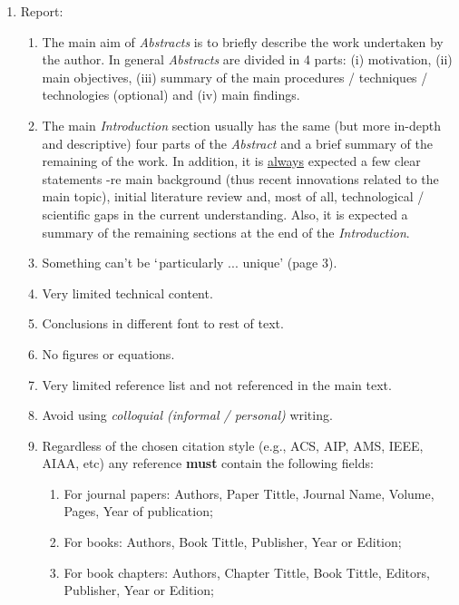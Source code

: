 \documentclass[14pt,twoside]{report}
\begin{document}
\begin{enumerate}

\item Report:
\begin{enumerate}
%
\item The main aim of {\it Abstracts} is to briefly describe the work undertaken by the author. In general {\it Abstracts} are divided in 4 parts: (i) motivation, (ii) main objectives, (iii) summary of the main procedures / techniques / technologies (optional) and (iv) main findings. 
%
\item The main {\it Introduction} section usually has the same (but more in-depth and descriptive) four parts of the {\it Abstract} and a brief summary of the remaining of the work. In addition, it is \underline{always} expected a few clear statements -re main background (thus recent innovations related to the main topic), initial literature review and, most of all, technological / scientific gaps in the current understanding. Also, it is expected a summary of the remaining sections at the end of the {\it Introduction}.
%
\item Something can't be $\lq$particularly ... unique' (page 3).
%
\item Very limited technical content.
%
\item Conclusions in different font to rest of text.
%
\item No figures or equations.
%
\item Very limited reference list and not referenced in the main text.
%
%
\item Avoid using {\it colloquial (informal / personal)} writing.
%
\item Regardless of the chosen citation style (e.g., ACS, AIP, AMS, IEEE, AIAA, etc) any reference {\bf must} contain the following fields: 
\begin{enumerate}
\item For journal papers: Authors, Paper Tittle, Journal Name, Volume, Pages, Year of publication;
\item For books: Authors, Book Tittle, Publisher, Year or Edition;
\item For book chapters: Authors, Chapter Tittle, Book Tittle, Editors, Publisher, Year or Edition;

\end{enumerate}
\end{enumerate}
\end{enumerate}
\end{document}
